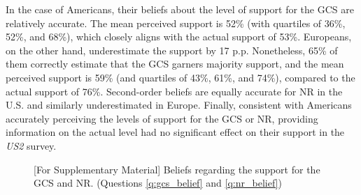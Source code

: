 In the case of Americans, their beliefs about the level of support for the GCS are relatively accurate. The mean perceived support is 52\% (with quartiles of 36\%, 52\%, and 68\%), which closely aligns with the actual support of 53\%. Europeans, on the other hand, underestimate the support by 17 p.p. Nonetheless, 65\% of them correctly estimate that the GCS garners majority support, and the mean perceived support is 59\% (and quartiles of 43\%, 61\%, and 74\%), compared to the actual support of 76\%. Second-order beliefs are equally accurate for NR in the U.S. and similarly underestimated in Europe. %
Finally, consistent with Americans accurately perceiving the levels of support for the GCS or NR, providing information on the actual level had no significant effect on their support in the \textit{US2} survey. %

\begin{figure}[h!]
    \caption[Beliefs about support for the GCS and NR]{[For Supplementary Material] Beliefs regarding the support for the GCS and NR. (Questions \ref{q:gcs_belief} and \ref{q:nr_belief})}\label{fig:belief}
\end{figure}


